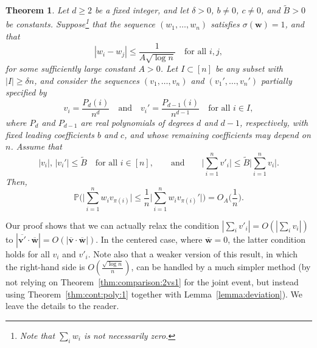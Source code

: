 \documentclass[reqno]{amsart}
\renewcommand\P{{\mathbb{P}}}
\newcommand\BMv{{\bm v}}
\newcommand\BMw{{\bm w}}
\theoremstyle{plain}
\newtheorem{theorem}{Theorem}[section]
\theoremstyle{definition}
\begin{document}
\begin{theorem}\label{thm:comparison:2vs1'}
Let $d \ge 2$ be a fixed integer, and let $\delta > 0$, $b \ne 0$, $c \ne 0$, and $\widetilde{B} > 0$ be constants. Suppose\footnote{Note that $\sum_i w_i$ is not necessarily zero.} that the sequence $(w_1, \dots, w_n)$ satisfies $\sigma(\BMw) = 1$, and that
\[
|w_i - w_j| \le \frac{1}{A \sqrt{\log n}} \quad \text{for all } i, j,
\]
for some sufficiently large constant $A > 0$.
Let $I \subset [n]$ be any subset with $|I| \ge \delta n$, and consider the sequences $(v_1, \dots, v_n)$ and $(v_1', \dots, v_n')$ partially specified by
\[
v_i = \frac{P_d(i)}{n^{d}} \quad \text{and} \quad v_i' = \frac{P_{d-1}(i)}{n^{d-1}} \quad \text{for all } i \in I,
\]
where $P_d$ and $P_{d-1}$ are real polynomials of degrees $d$ and $d - 1$, respectively, with fixed leading coefficients $b$ and $c$, and whose remaining coefficients may depend on $n$.
Assume that
\[
|v_i|,\, |v_i'| \le \widetilde{B} \quad \text{for all } i \in [n], \qquad \text{and} \qquad \Big| \sum_{i=1}^{n} v'_{i} \Big| \le \widetilde{B}\Big| \sum_{i=1}^{n} v_{i} \Big|.
\]
Then,
\begin{equation}
\P\Big( \Big| \sum_{i=1}^n w_i v_{\pi(i)} \Big| \le \frac{1}{n} \Big| \sum_{i=1}^n w_i v_{\pi(i)}' \Big| \Big) = O_{A}\Big( \frac{1}{n} \Big).
\end{equation}
\end{theorem}
Our proof shows that we can actually relax the condition $|\sum_{i}v'_i| =O(|\sum_{i}v_i|)$ to 
$| \overline{\BMv'} \cdot \overline{\BMw} | = O(| \overline{\BMv} \cdot \overline{\BMw}|)$. In the centered case, where $\overline{\BMw} = 0$, the latter condition holds for all $v_i$ and $v'_i$. Note also that a weaker version of this result, in which the right-hand side is 
$O(\frac{\sqrt{\log n}}{n})$, can be handled by a much simpler method 
(by not relying on Theorem~\ref{thm:comparison:2vs1} for the joint event, but instead 
using Theorem~\ref{thm:cont:poly:1} together with Lemma~\ref{lemma:deviation}).  
We leave the details to the reader.
\end{document}
